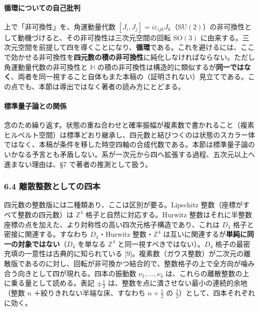 \documentclass[
]{ltjsarticle}
\begin{document}
\paragraph{循環についての自己批判}\label{ux5faaux74b0ux306bux3064ux3044ux3066ux306eux81eaux5df1ux6279ux5224}

上で「非可換性」を、角運動量代数
\([J_i,J_j]=i\varepsilon_{ijk}J_k\)（\(\mathrm{SU}(2)\)）の非可換性として動機づけると、その非可換性は三次元空間の回転
\(\mathrm{SO}(3)\)
に由来する。三次元空間を前提して四を導くことになり、\textbf{循環}である。これを避けるには、ここで効かせる非可換性を\textbf{四元数の積の非可換性}に純化しなければならない。ただし角運動量代数の非可換性と
\(\mathbb{H}\)
の積の非可換性は構造的に類似するが\textbf{同一ではなく}、両者を同一視すること自体もまた本稿の（証明されない）見立てである。この点でも、本節は導出ではなく著者の読み方にとどまる。

\paragraph{標準量子論との関係}\label{ux6a19ux6e96ux91cfux5b50ux8ad6ux3068ux306eux95a2ux4fc2}

念のため繰り返す。状態の重ね合わせと確率振幅が複素数で書かれること（複素ヒルベルト空間）は標準どおり継承し、四元数と結びつくのは状態のスカラー体ではなく、本稿が条件を移した時空四軸の合成代数である。本節は標準量子論のいかなる予言とも矛盾しない。系が一次元から四へ拡張する過程、五次元以上へ進まない理由は、§7
で著者の推測として扱う。

\subsubsection{6.4
離散整数としての四本}\label{ux96e2ux6563ux6574ux6570ux3068ux3057ux3066ux306eux56dbux672c}

四元数の整数版には二種類あり、ここは区別が要る。Lipschitz
整数（座標がすべて整数の四元数）は \(\mathbb{Z}^4\)
格子と自然に対応する。Hurwitz
整数はそれに半整数座標の点を加えた、より対称性の高い四次元格子構造であり、これは
\(D_4\) 格子と密接に関連する。すなわち \(D_4\)・Hurwitz
整数・\(\mathbb{Z}^4\)
は互いに関連するが\textbf{単純に同一の対象ではない}（\(D_4\) を単なる
\(\mathbb{Z}^4\) と同一視すべきではない）。\(D_4\)
格子の最密充填の一意性は古典的に知られている
{[}9{]}。複素数（ガウス整数）が二次元の離散版であるのに対し、回転が非可換かつ結合的で、整数格子の上で全方向が噛み合う向きとして四が現れる。四本の振動数
\(\nu_1,\dots,\nu_4\) は、これらの離散整数の上に乗る量として読める。表記
\(\pm\tfrac12\) は、整数を点に潰させない最小の連続的余地（整数 \(n\)
＋絞りきれない半端な床、すなわち \(n+\tfrac12\) の
\(\tfrac12\)）として、四本それぞれに効く。
\end{document}
